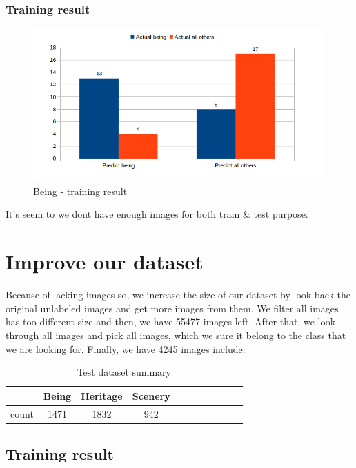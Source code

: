 \documentclass[11pt]{article}
\begin{document}
\subsubsection{Training result}

\begin{figure}[H]
\centering
\includegraphics[width=1\textwidth]{images/test_43_image_result}
\caption{Being - training result}
\end{figure}

It's seem to we dont have enough images for both train \& test purpose. 

\section{Improve our dataset}

Because of lacking images so, we increase the size of our dataset by look back the original unlabeled images and get more images from them. We filter all images has too different size and then, we have 55477 images left. After that, we  look through all images and pick all images, which we sure it belong to the class that we are looking for. Finally, we have 4245 images include:
 
\begin{table}[H]
\begin{center}
\begin{tabular}{| c | c | c | c | c | c | c | c | c | c | c |}
\hline
 & Being & Heritage & Scenery\\
\hline
count & 1471 & 1832 & 942 \\
\hline
\end{tabular}
\caption {Test dataset summary}
\end{center}
\end{table}

\subsection{Training result}
\end{document}
